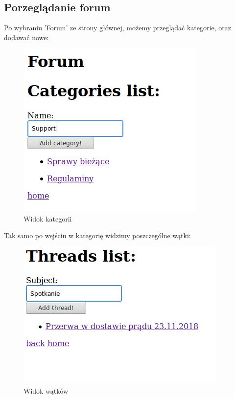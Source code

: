 \documentclass[12pt]{article}
\begin{document}
\subsection{Porzeglądanie forum}
Po wybraniu 'Forum' ze strony głównej, możemy przeglądać kategorie, oraz dodawać nowe:
\begin{figure}[H]
	\centering
	\includegraphics[scale=0.7]{img/10.png}
	\caption{Widok kategorii}
\end{figure}
Tak samo po wejściu w kategorię widzimy poszczególne wątki:
\begin{figure}[H]
	\centering
	\includegraphics[scale=0.7]{img/11.png}
	\caption{Widok wątków}
\end{figure}
\end{document}
